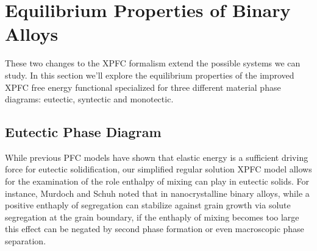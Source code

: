 \documentclass[showkeys, prb, reprint]{revtex4-1}
\begin{document}
\section{Equilibrium Properties of Binary Alloys} %

These two changes to the XPFC formalism extend the possible systems we can
study. In this section we'll explore the equilibrium properties of the improved
XPFC free energy functional specialized for three different material phase
diagrams: eutectic, syntectic and monotectic.

\subsection{Eutectic Phase Diagram} %

While previous PFC models have shown that elastic energy is a sufficient
driving force for eutectic solidification, our simplified regular solution XPFC
model allows for the examination of the role enthalpy of mixing can play in
eutectic solids.  For instance, Murdoch and Schuh noted that in nanocrystalline
binary alloys, while a positive enthaply of segregation can stabilize against
grain growth via solute segregation at the grain boundary, if the enthaply of
mixing becomes too large this effect can be negated by second phase formation
or even macroscopic phase separation\cite{MURDOCH13}. 
\end{document}
